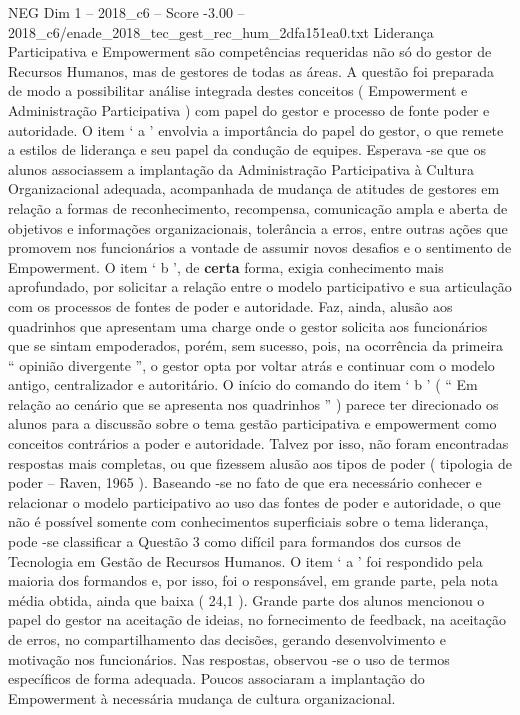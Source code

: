 \begin{textsample}{NEG Dim 1 – 2018\_c6 – Score -3.00 – 2018\_c6/enade\_2018\_tec\_gest\_rec\_hum\_2dfa151ea0.txt}
Liderança Participativa e Empowerment são competências requeridas não só do gestor de Recursos Humanos, mas de gestores de todas as áreas.
A questão foi preparada de modo a possibilitar análise integrada destes conceitos ( Empowerment e Administração Participativa ) com papel do gestor e processo de fonte poder e autoridade.
O item ‘ a ’ envolvia a importância do papel do gestor, o que remete a estilos de liderança e seu papel da condução de equipes.
Esperava -se que os alunos associassem a implantação da Administração Participativa à Cultura Organizacional adequada, acompanhada de mudança de atitudes de gestores em relação a formas de reconhecimento, recompensa, comunicação ampla e aberta de objetivos e informações organizacionais, tolerância a erros, entre outras ações que promovem nos funcionários a vontade de assumir novos desafios e o sentimento de Empowerment.
O item ‘ b ’, de \textbf{certa} forma, exigia conhecimento mais aprofundado, por solicitar a relação entre o modelo participativo e sua articulação com os processos de fontes de poder e autoridade.
Faz, ainda, alusão aos quadrinhos que apresentam uma charge onde o gestor solicita aos funcionários que se sintam empoderados, porém, sem sucesso, pois, na ocorrência da primeira “ opinião divergente ”, o gestor opta por voltar atrás e continuar com o modelo antigo, centralizador e autoritário.
O início do comando do item ‘ b ’ ( “ Em relação ao cenário que se apresenta nos quadrinhos ” ) parece ter direcionado os alunos para a discussão sobre o tema gestão participativa e empowerment como conceitos contrários a poder e autoridade.
Talvez por isso, não foram encontradas respostas mais completas, ou que fizessem alusão aos tipos de poder ( tipologia de poder – Raven, 1965 ).
Baseando -se no fato de que era necessário conhecer e relacionar o modelo participativo ao uso das fontes de poder e autoridade, o que não é possível somente com conhecimentos superficiais sobre o tema liderança, pode -se classificar a Questão 3 como difícil para formandos dos cursos de Tecnologia em Gestão de Recursos Humanos.
O item ‘ a ’ foi respondido pela maioria dos formandos e, por isso, foi o responsável, em grande parte, pela nota média obtida, ainda que baixa ( 24,1 ).
Grande parte dos alunos mencionou o papel do gestor na aceitação de ideias, no fornecimento de feedback, na aceitação de erros, no compartilhamento das decisões, gerando desenvolvimento e motivação nos funcionários.
Nas respostas, observou -se o uso de termos específicos de forma adequada.
Poucos associaram a implantação do Empowerment à necessária mudança de cultura organizacional.

\end{textsample}
